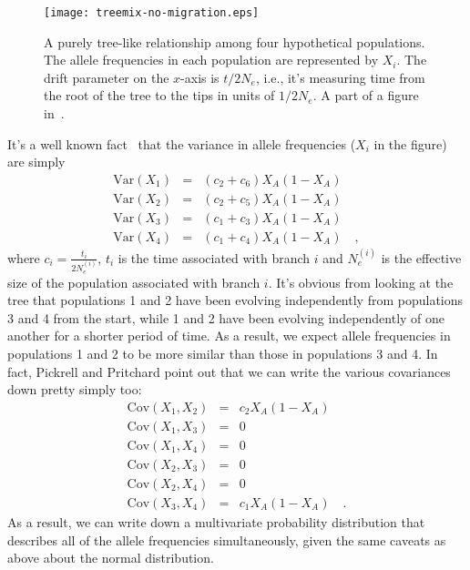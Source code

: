 \begin{figure}
  \begin{center}
    \texttt{[image: treemix-no-migration.eps]}
  \end{center}
  \caption{A purely tree-like relationship among four hypothetical
    populations. The allele frequencies in each population are
    represented by $X_i$. The drift parameter on the $x$-axis is $t/2N_e$,
    i.e., it's measuring time from the root of the tree to the tips in
    units of $1/2N_e$. A part of a figure in~\cite{Pickrell-Pritchard-2012}.}\label{fig:treemix-no-migration}
\end{figure}

It's a well known fact~\cite{CavalliSforza-Edwards-1967} that the
variance in allele frequencies ($X_i$ in the figure) are simply
\begin{eqnarray*}
  \mbox{Var}(X_1) &=& (c_2 + c_6)X_A(1-X_A) \\
  \mbox{Var}(X_2) &=& (c_2 + c_5)X_A(1-X_A) \\
  \mbox{Var}(X_3) &=& (c_1 + c_3)X_A(1-X_A) \\
  \mbox{Var}(X_4) &=& (c_1 + c_4)X_A(1-X_A) \quad ,
\end{eqnarray*}
where $c_i = \frac{t_i}{2N_e^{(i)}}$, $t_i$ is the time associated
with branch $i$ and $N_e^{(i)}$ is the effective size of the
population associated with branch $i$. It's obvious from looking at
the tree that populations 1 and 2 have been evolving independently
from populations 3 and 4 from the start, while 1 and 2 have been
evolving independently of one another for a shorter period of time. As
a result, we expect allele frequencies in populations 1 and 2 to be
more similar than those in populations 3 and 4. In fact, Pickrell and
Pritchard point out that we can write the various covariances down
pretty simply too:
\begin{eqnarray*}
  \mbox{Cov}(X_1,X_2) &=& c_2X_A(1-X_A) \\
  \mbox{Cov}(X_1,X_3) &=& 0 \\
  \mbox{Cov}(X_1,X_4) &=& 0 \\
  \mbox{Cov}(X_2,X_3) &=& 0 \\
  \mbox{Cov}(X_2,X_4) &=& 0 \\
  \mbox{Cov}(X_3,X_4) &=& c_1X_A(1-X_A) \quad .
\end{eqnarray*}
As a result, we can write down a multivariate probability distribution
that describes all of the allele frequencies simultaneously, given the
same caveats as above about the normal distribution.
